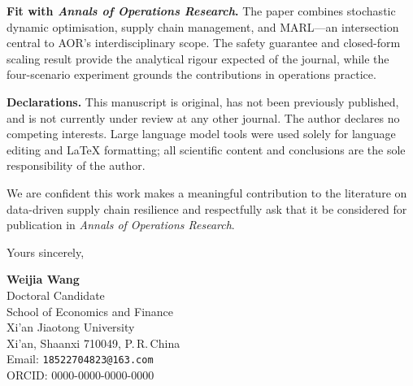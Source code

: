 \documentclass[11pt,a4paper]{article}
\begin{document}
\textbf{Fit with \textit{Annals of Operations Research}.}
The paper combines stochastic dynamic optimisation, supply chain management, and
MARL---an intersection central to AOR's interdisciplinary scope.  The safety guarantee
and closed-form scaling result provide the analytical rigour expected of the journal,
while the four-scenario experiment grounds the contributions in operations practice.

\textbf{Declarations.}
This manuscript is original, has not been previously published, and is not currently
under review at any other journal.  The author declares no competing interests.
Large language model tools were used solely for language editing and \LaTeX{}
formatting; all scientific content and conclusions are the sole responsibility of the
author.

We are confident this work makes a meaningful contribution to the literature on
data-driven supply chain resilience and respectfully ask that it be considered for
publication in \textit{Annals of Operations Research}.

\bigskip

Yours sincerely,

\bigskip\bigskip

\textbf{Weijia Wang}\\
Doctoral Candidate\\
School of Economics and Finance\\
Xi'an Jiaotong University\\
Xi'an, Shaanxi 710049, P.\,R.\,China\\
Email: \texttt{18522704823@163.com}\\
ORCID: 0000-0000-0000-0000
\end{document}
